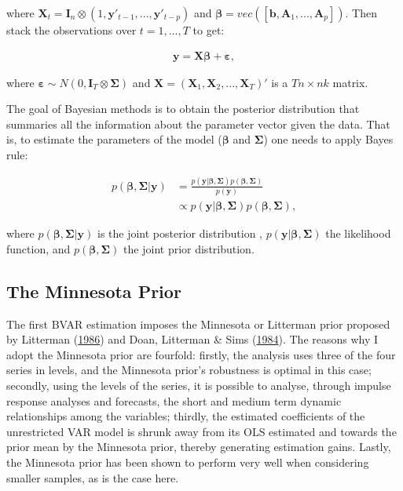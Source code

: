 \documentclass[11pt,preprint, authoryear]{elsarticle}
\numberwithin{equation}{section}
\numberwithin{figure}{section}
\numberwithin{table}{section}
\begin{document}
where
\(\bm{X}_t = \bm{I}_n \otimes (1, \bm{y}'_{t-1}, ..., \bm{y}'_{t-p} )\)
and \(\bm{\beta} = vec([\bm{b}, \bm{A}_{1}, ..., \bm{A}_{p}])\). Then
stack the observations over \(t = 1,...,T\) to get:

\begin{align}
\bm{y} = \bm{X} \bm{\beta}  + \bm{\varepsilon}, \label{VAR2}
\end{align}

where \(\bm{\varepsilon} \sim N(0, \bm{I}_T \otimes \bm{\Sigma})\) and
\(\bm{X} = (\bm{X}_1, \bm{X}_2, ..., \bm{X}_T)'\) is a \(Tn \times nk\)
matrix.

The goal of Bayesian methods is to obtain the posterior distribution
that summaries all the information about the parameter vector given the
data. That is, to estimate the parameters of the model (\(\bm{\beta}\)
and \(\bm{\Sigma}\)) one needs to apply Bayes rule:

\begin{align}
p(\bm{\beta}, \bm{\Sigma} | \bm{y}) &= \frac{p(\bm{y} | \bm{\beta}, \bm{\Sigma}) p( \bm{\beta}, \bm{\Sigma})}{p(\bm{y})} \\ 
 &\propto  p(\bm{y} | \bm{\beta}, \bm{\Sigma}) p( \bm{\beta}, \bm{\Sigma}),      \label{bayesrule}
\end{align}

where \(p(\bm{\beta}, \bm{\Sigma} | \bm{y})\) is the joint posterior
distribution , \(p(\bm{y} | \bm{\beta}, \bm{\Sigma})\) the likelihood
function, and \(p( \bm{\beta}, \bm{\Sigma})\) the joint prior
distribution.

\hypertarget{the-minnesota-prior}{%
\subsection{The Minnesota Prior}\label{the-minnesota-prior}}

The first BVAR estimation imposes the Minnesota or Litterman prior
proposed by Litterman (\protect\hyperlink{ref-litterman1986}{1986}) and
Doan, Litterman \& Sims (\protect\hyperlink{ref-doan1984}{1984}). The
reasons why I adopt the Minnesota prior are fourfold: firstly, the
analysis uses three of the four series in levels, and the Minnesota
prior's robustness is optimal in this case; secondly, using the levels
of the series, it is possible to analyse, through impulse response
analyses and forecasts, the short and medium term dynamic relationships
among the variables; thirdly, the estimated coefficients of the
unrestricted VAR model is shrunk away from its OLS estimated and towards
the prior mean by the Minnesota prior, thereby generating estimation
gains. Lastly, the Minnesota prior has been shown to perform very well
when considering smaller samples, as is the case here.
\end{document}
